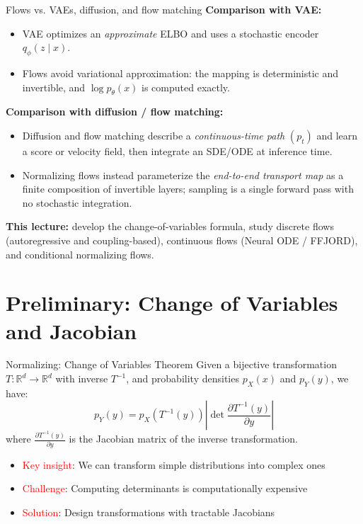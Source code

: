 \documentclass[aspectratio=169]{beamer}
\begin{document}
\begin{frame}{Flows vs. VAEs, diffusion, and flow matching}
\textbf{Comparison with VAE:}
\begin{itemize}
    \item VAE optimizes an \emph{approximate} ELBO and uses a stochastic encoder $q_\phi(z\mid x)$.
    \item Flows avoid variational approximation: the mapping is deterministic and invertible, and $\log p_\theta(x)$ is computed exactly.
\end{itemize}

\textbf{Comparison with diffusion / flow matching:}
\begin{itemize}
    \item Diffusion and flow matching describe a \emph{continuous-time path} $(p_t)$ and learn a score or velocity field, then integrate an SDE/ODE at inference time.
    \item Normalizing flows instead parameterize the \emph{end-to-end transport map} as a finite composition of invertible layers; sampling is a single forward pass with no stochastic integration.
\end{itemize}

\textbf{This lecture:} develop the change-of-variables formula, study discrete flows (autoregressive and coupling-based), continuous flows (Neural ODE / FFJORD), and conditional normalizing flows.
\end{frame}

\section{Preliminary: Change of Variables and Jacobian}

\begin{frame}{Normalizing: Change of Variables Theorem}
Given a bijective transformation $T: \mathbb{R}^d \to \mathbb{R}^d$ with inverse $T^{-1}$, and probability densities $p_X(x)$ and $p_Y(y)$, we have:
\begin{equation}
    p_Y(y) = p_X(T^{-1}(y)) \left|\det \frac{\partial T^{-1}(y)}{\partial y}\right|
\end{equation}
where $\frac{\partial T^{-1}(y)}{\partial y}$ is the Jacobian matrix of the inverse transformation.

\begin{itemize}
    \item \textcolor{red}{Key insight}: We can transform simple distributions into complex ones
    \item \textcolor{red}{Challenge}: Computing determinants is computationally expensive
    \item \textcolor{red}{Solution}: Design transformations with tractable Jacobians
\end{itemize}
\end{frame}
\end{document}
